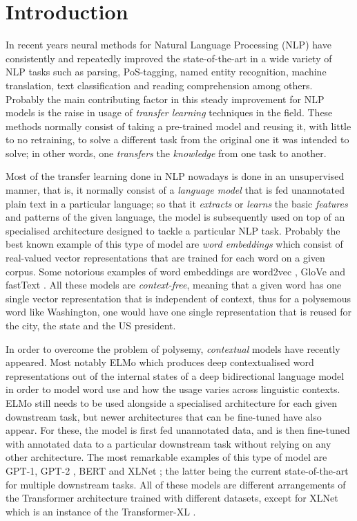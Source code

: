 \section{Introduction}

In recent years neural methods for Natural Language Processing (NLP) have consistently and repeatedly improved the state-of-the-art in a wide variety of NLP tasks such as parsing, PoS-tagging, named entity recognition, machine translation, text classification and reading comprehension among others. Probably the main contributing factor in this steady improvement for NLP models is the raise in usage of \emph{transfer learning} techniques in the field. These methods normally consist of taking a pre-trained model and reusing it, with little to no retraining, to solve a different task from the original one it was intended to solve; in other words, one \emph{transfers} the \emph{knowledge} from one task to another.

Most of the transfer learning done in NLP nowadays is done in an unsupervised manner, that is, it normally consist of a  \emph{language model} that is fed unannotated plain text in a particular language; so that it \emph{extracts} or \emph{learns} the basic \emph{features} and patterns of the given language, the model is subsequently used on top of an specialised architecture designed to tackle a particular NLP task. Probably the best known example of this type of model are \emph{word embeddings} which consist of real-valued vector representations that are trained for each word on a given corpus. Some notorious examples of word embeddings are word2vec \citep{mikolov-etal-2013-distributed}, GloVe \citep{pennington-etal-2014-glove} and \mbox{fastText} \citep{mikolov-etal-2018-advances}. All these models are \emph{context-free}, meaning that a given word has one single vector representation that is independent of context, thus for a polysemous word like Washington, one would have one single representation that is reused for the city, the state and the US president.

In order to overcome the problem of polysemy, \emph{contextual} models have recently appeared. Most notably ELMo \citep{Peters:2018} which produces deep contextualised word representations out of the internal states of a deep bidirectional language model in order to model word use and how the usage varies across linguistic contexts. ELMo still needs to be used alongside a specialised architecture for each given downstream task, but newer architectures that can be fine-tuned have also appear. For these, the model is first fed unannotated data, and is then fine-tuned with annotated data to a particular downstream task without relying on any other architecture. The most remarkable examples of this type of model are GPT-1, GPT-2 \citep{Radford:2018, Radford:2019}, BERT \citep{devlin-etal-2019-bert} and XLNet \citep{Yang:2019}; the latter being the current state-of-the-art for multiple downstream tasks. All of these models are different arrangements of the Transformer architecture \citep{Vaswani:2017} trained with different datasets, except for XLNet which is an instance of the Transformer-XL \citep{Dai:2019}.

